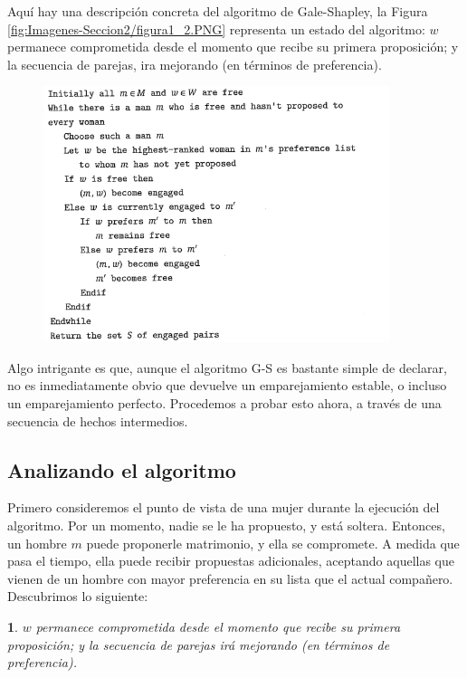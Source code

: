 \documentclass[a4paper, 12pt]{book}
\theoremstyle{dotless}
\newtheorem{theorem}{}[section]
\begin{document}
Aquí hay una descripción concreta del algoritmo de Gale-Shapley, la Figura \ref{fig:Imagenes-Seccion2/figura1_2.PNG} representa un estado del algoritmo: $w$ permanece comprometida desde el momento que recibe su primera proposición; y la secuencia de parejas, ira mejorando (en términos de preferencia).

\begin{figure}[h] 
    \centering
    \includegraphics[width=0.9\textwidth]{Imagenes-Seccion2/Imagen1_2.PNG}
\end{figure}

Algo intrigante es que, aunque el algoritmo G-S es bastante simple de declarar, no es inmediatamente obvio que devuelve un emparejamiento estable, o incluso un emparejamiento perfecto. Procedemos a probar esto ahora, a través de una secuencia de hechos intermedios.

\subsection*{Analizando el algoritmo}  

Primero consideremos el punto de vista de una mujer durante la ejecución del algoritmo. Por un momento, nadie se le ha propuesto, y está soltera. Entonces, un hombre $m$ puede proponerle matrimonio, y ella se compromete. A medida que pasa el tiempo, ella puede recibir propuestas adicionales, aceptando aquellas que vienen de un hombre con mayor preferencia en su lista que el actual compañero. Descubrimos lo siguiente:

\begin{theorem}
$w$ permanece comprometida desde el momento que recibe su primera proposición; y la secuencia de parejas irá mejorando (en términos de preferencia).
\end{theorem}
\end{document}
